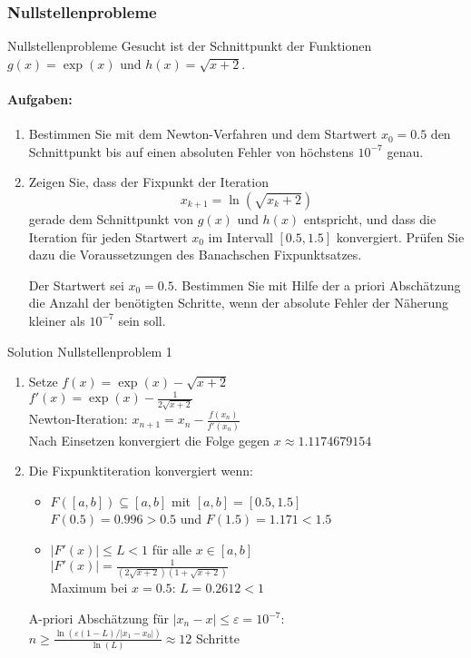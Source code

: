 \subsubsection{Nullstellenprobleme}

\begin{example2}{Nullstellenprobleme}
Gesucht ist der Schnittpunkt der Funktionen $g(x) = \exp(x)$ und $h(x) = \sqrt{x+2}$.

\paragraph{Aufgaben:}
\begin{enumerate}
    \item Bestimmen Sie mit dem Newton-Verfahren und dem Startwert $x_0 = 0.5$ den Schnittpunkt bis auf einen absoluten Fehler von höchstens $10^{-7}$ genau.
    
    \item Zeigen Sie, dass der Fixpunkt der Iteration
    $$x_{k+1} = \ln(\sqrt{x_k + 2})$$
    gerade dem Schnittpunkt von $g(x)$ und $h(x)$ entspricht, und dass die Iteration für jeden Startwert $x_0$ im Intervall $[0.5, 1.5]$ konvergiert. Prüfen Sie dazu die Voraussetzungen des Banachschen Fixpunktsatzes.
    
    Der Startwert sei $x_0 = 0.5$. Bestimmen Sie mit Hilfe der a priori Abschätzung die Anzahl der benötigten Schritte, wenn der absolute Fehler der Näherung kleiner als $10^{-7}$ sein soll.
\end{enumerate}
\end{example2}

\begin{KR}{Solution Nullstellenproblem 1}
\begin{enumerate}
    \item Setze $f(x) = \exp(x) - \sqrt{x+2}$\\
    $f'(x) = \exp(x) - \frac{1}{2\sqrt{x+2}}$\\
    Newton-Iteration: $x_{n+1} = x_n - \frac{f(x_n)}{f'(x_n)}$\\
    Nach Einsetzen konvergiert die Folge gegen $x \approx 1.1174679154$
    
    \item Die Fixpunktiteration konvergiert wenn:
    \begin{itemize}
        \item $F([a,b]) \subseteq [a,b]$ mit $[a,b] = [0.5, 1.5]$\\
        $F(0.5) = 0.996 > 0.5$ und $F(1.5) = 1.171 < 1.5$ \checkmark
        \item $|F'(x)| \leq L < 1$ für alle $x \in [a,b]$\\
        $|F'(x)| = \frac{1}{(2\sqrt{x+2})(1+\sqrt{x+2})}$\\
        Maximum bei $x=0.5$: $L=0.2612 < 1$ \checkmark
    \end{itemize}
    A-priori Abschätzung für $|x_n - x| \leq \varepsilon = 10^{-7}$:\\
    $n \geq \frac{\ln(\varepsilon(1-L)/|x_1-x_0|)}{\ln(L)} \approx 12$ Schritte
\end{enumerate}
\end{KR}

